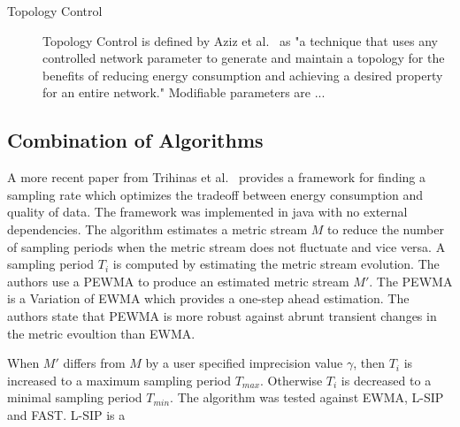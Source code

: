 \begin{description}
    \item[Topology Control] 
    Topology Control is defined by Aziz et al.~\cite{aziz2013survey} as "a
    technique that uses any controlled network parameter to generate and
    maintain a topology for the benefits of reducing energy consumption and
    achieving a desired property for an entire network." Modifiable parameters are ...
\end{description}


\subsection{Combination of Algorithms}
\label{sec:Combination of Algorithms}
A more recent paper from Trihinas et al.~\cite{trihinas2015adam} provides a
framework for finding a sampling rate which optimizes the tradeoff between
energy consumption and quality of data. The framework was implemented in java
with no external dependencies. The algorithm estimates a metric stream $ M $
to reduce the number of sampling periods when the metric stream does not
fluctuate and vice versa. A sampling period $ T_i $ is computed by estimating
the metric stream evolution. The authors use a \ac{PEWMA} to produce an
estimated metric stream $ M' $. The \ac{PEWMA} is a Variation of \ac{EWMA}
which provides a one-step ahead estimation. The authors state that \ac{PEWMA}
is more robust against abrunt transient changes in the metric evoultion than
\ac{EWMA}.

When $ M' $ differs from $ M $ by a user specified imprecision value $
\gamma $, then $ T_i $ is increased to a maximum sampling period $ T_{max}
$. Otherwise $ T_i $ is decreased to a minimal sampling period $ T_{min}
$. The algorithm was tested against \ac{EWMA}, L-SIP and FAST. L-SIP is a  

